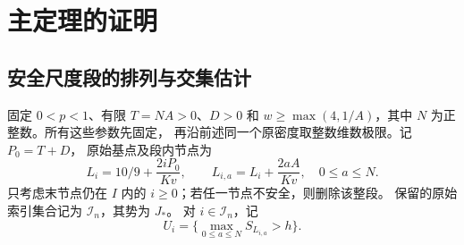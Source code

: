 \documentclass[UTF8,a4paper,11pt,fontset=fandol]{ctexart}
\theoremstyle{remark}
\begin{document}
\section{主定理的证明}\label{sec:mainproof}
\subsection{安全尺度段的排列与交集估计}
固定 $0<p<1$、有限 $T=NA>0$、$D>0$ 和
$w\ge\max(4,1/A)$，其中 $N$ 为正整数。所有这些参数先固定，
再沿前述同一个原密度取整数维数极限。记 $P_0=T+D$，
原始基点及段内节点为
\[
 L_i=10/9+\frac{2iP_0}{Kv},\qquad
 L_{i,a}=L_i+\frac{2aA}{Kv},\quad0\le a\le N.
\]
只考虑末节点仍在 $I$ 内的 $i\ge0$；若任一节点不安全，则删除该整段。
保留的原始索引集合记为 $\mathcal I_n$，其势为 $J_*$。
对 $i\in\mathcal I_n$，记
\[
 U_i=\{\max_{0\le a\le N}S_{L_{i,a}}>h\}.
\]
\end{document}
